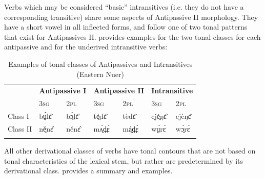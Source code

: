 \documentclass[output=paper,newtxmath,modfonts,nonflat]{langsci/langscibook}
\begin{document}
Verbs which may be considered “basic” intransitives (i.e. they do not have a corresponding transitive) share some aspects of Antipassive II morphology. They have a short vowel in all inflected forms, and follow one of two tonal patterns that exist for Antipassives II.  provides examples for the two tonal classes for each antipassive and for the underived intransitive verbs:


\begin{table}
\begin{tabularx}{\textwidth}{XXXXXXX} 
\lsptoprule
& \multicolumn{2}{l}{\bfseries Antipassive I} & \multicolumn{2}{l}{\bfseries Antipassive II} & \multicolumn{2}{c}{\bfseries Intransitive}\\
& 3\textsc{sg} & 2\textsc{pl} & 3\textsc{sg} & 2\textsc{pl} & 3\textsc{sg} & 2\textsc{pl}\\
\midrule
Class I & bṳ̀lɛ̂ & bɔ̤̀lɛ̂ & tè̤dɛ̂ & tèdɛ̂ & cjè̤ŋɛ̂ & cjèŋɛ̂\\
Class II & ně̤nɛ̂ & něnɛ̂ & mʌ̤́d̪ɛ̀ & má̤d̪ɛ̀ & wṳ́rɛ̀ & wɔ̤́rɛ̀\\
\lspbottomrule
\end{tabularx}
\caption{Examples of tonal classes of Antipassives and Intransitives (Eastern Nuer)}
\label{tab:monich:14}
\end{table}

All other derivational classes of verbs have tonal contours that are not based on tonal characteristics of the lexical stem, but rather are predetermined by its derivational class.  provides a summary and examples.
\end{document}
